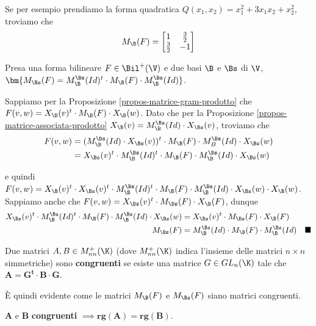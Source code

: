 \documentclass[11pt, a4paper, titlepage, oneside]{scrbook}
\begin{document}
Se per esempio prendiamo la forma quadratica $Q(x_1, x_2) = x_1^2 + 3x_1x_2 + x_2^2$, troviamo che 
\[
M_\B(F) = \begin{bmatrix}
    1 & \frac{3}{2} \\
    \frac{3}{2} & -1
\end{bmatrix}
\]

\begin{Proposizione}
\label{propos-cambiamento-base-matrice-Gram}
Presa una forma bilineare $F \in \Bil^+(\V)$ e due basi $\B$ e $\Bs$ di $\V$, \mbox{$\bm{M_\Bs(F) = M_\B^\Bs(Id)^t \cdot M_\B(F) \cdot M_\B^\Bs(Id)}$}.
\end{Proposizione}

\Dimostrazione \nopagebreak

Sappiamo per la Proposizione \ref{propos-matrice-gram-prodotto} che $F(v,w) = X_\B(v)^t \cdot M_\B(F) \cdot X_\B(w)$. Dato che per la Proposizione \ref{propos-matrice-associata-prodotto} $X_\B(v) = M_\B^\Bs(Id) \cdot X_\Bs(v)$, troviamo che
\begin{align*}
 F(v,w) &= (M_\B^\Bs(Id)  \cdot X_\Bs(v))^t \cdot M_\B(F) \cdot M_B^\Bs(Id) \cdot X_\Bs(w) \\
 &= X_\Bs(v)^t \cdot M_\B^\Bs(Id)^t \cdot M_\B(F) \cdot M_\B^\Bs(Id) \cdot X_\Bs(w) 
\end{align*}

e quindi $F(v,w) = X_\B(v)^t \cdot X_\Bs(v)^t \cdot M_\B^\Bs(Id)^t \cdot M_\B(F) \cdot M_\B^\Bs(Id) \cdot X_\Bs(w) \cdot X_\B(w)$. Sappiamo anche che $F(v,w) = X_\Bs(v)^t \cdot M_\Bs(F) \cdot X_\B(F)$, dunque
\begin{align*}
X_\Bs(v)^t \cdot M_\B^\Bs(Id)^t \cdot M_\B(F) \cdot M_\B^\Bs(Id) \cdot X_\Bs(w) &= X_\Bs(v)^t \cdot M_\Bs(F) \cdot X_\B(F) \\
M_\Bs(F) &= M_\B^\Bs(Id) \cdot M_\B(F) \cdot M_\B^\Bs(Id) \quad \blacksquare
\end{align*}

\begin{Definizione}
\label{def-matrici-congruenti}
Due matrici $A,B \in M^+_{nn}(\K)$ (dove $M^+_{nn}(\K)$ indica l'insieme delle matrici $n \times n$ simmetriche) sono \textbf{congruenti} se esiste una matrice $G \in GL_n(\K)$ tale che $\bm{A = G^t \cdot B \cdot G}$. 
\end{Definizione}

È quindi evidente come le matrici $M_\B(F)$ e $M_\Bs(F)$ siano matrici congruenti.

\begin{Osservazione}[]
\label{oss-matrici-congruenti-rango-uguale}
$\bm{A}$ e $\bm{B}$ \textbf{congruenti} $\implies \bm{rg(A) = rg(B)}$.
\end{Osservazione}
\end{document}
